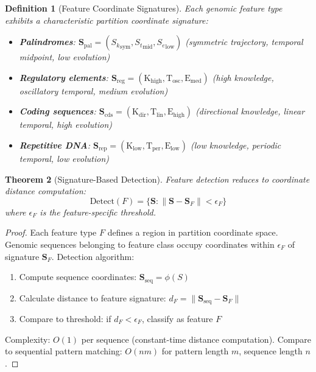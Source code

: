 \documentclass[11pt,a4paper]{article}
\newtheorem{theorem}{Theorem}[section]
\newtheorem{definition}[theorem]{Definition}
\theoremstyle{remark}
\newcommand{\Sk}{S_k}
\newcommand{\St}{S_t}
\newcommand{\Se}{S_e}
\newcommand{\Scoord}{\mathbf{S}}
\begin{document}
\begin{definition}[Feature Coordinate Signatures]
\label{def:feature_signatures}
Each genomic feature type exhibits a characteristic partition coordinate signature:
\begin{itemize}
\item \textbf{Palindromes}: $\Scoord_{\text{pal}} = ({\Sk}_{\text{sym}}, {\St}_{\text{mid}}, {\Se}_{\text{low}})$ (symmetric trajectory, temporal midpoint, low evolution)
\item \textbf{Regulatory elements}: $\Scoord_{\text{reg}} = (\mathrm{K}_{\text{high}}, \mathrm{T}_{\text{osc}}, \mathrm{E}_{\text{med}})$ (high knowledge, oscillatory temporal, medium evolution)
\item \textbf{Coding sequences}: $\Scoord_{\text{cds}} = (\mathrm{K}_{\text{dir}}, \mathrm{T}_{\text{lin}}, \mathrm{E}_{\text{high}})$ (directional knowledge, linear temporal, high evolution)
\item \textbf{Repetitive DNA}: $\Scoord_{\text{rep}} = (\mathrm{K}_{\text{low}}, \mathrm{T}_{\text{per}}, \mathrm{E}_{\text{low}})$ (low knowledge, periodic temporal, low evolution)
\end{itemize}
\end{definition}

\begin{theorem}[Signature-Based Detection]
\label{thm:signature_detection}
Feature detection reduces to coordinate distance computation:
\begin{equation}
\text{Detect}(F) = \{\Scoord : \|\Scoord - \Scoord_F\| < \epsilon_F\}
\end{equation}
where $\epsilon_F$ is the feature-specific threshold.
\end{theorem}

\begin{proof}
Each feature type $F$ defines a region in partition coordinate space. Genomic sequences belonging to feature class occupy coordinates within $\epsilon_F$ of signature $\Scoord_F$. Detection algorithm:
\begin{enumerate}
\item Compute sequence coordinates: $\Scoord_{\text{seq}} = \phi(S)$
\item Calculate distance to feature signature: $d_F = \|\Scoord_{\text{seq}} - \Scoord_F\|$
\item Compare to threshold: if $d_F < \epsilon_F$, classify as feature $F$
\end{enumerate}
Complexity: $O(1)$ per sequence (constant-time distance computation). Compare to sequential pattern matching: $O(nm)$ for pattern length $m$, sequence length $n$.
\end{proof}
\end{document}
